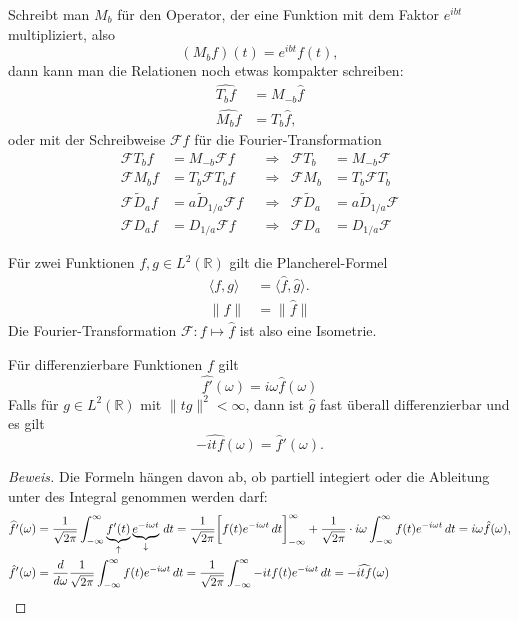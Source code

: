 Schreibt man $M_b$ für den Operator, der eine Funktion mit dem
Faktor $e^{ibt}$ multipliziert, also
\[
(M_bf)(t) = e^{ibt}f(t),
\]
dann kann man die Relationen noch etwas kompakter schreiben:
\begin{align*}
\widehat{T_bf}
&=
M_{-b}\hat{f}
\\
\widehat{M_bf}
&=
T_b\hat{f},
\end{align*}
oder mit der Schreibweise $\mathcal{F}f$ für die Fourier-Transformation
\[
\begin{aligned}
\mathcal{F}T_b f &= M_{-b}\mathcal F f
&&\Rightarrow &
\mathcal{F}T_b &= M_{-b}\mathcal{F}
\\
\mathcal{F}M_b f&=T_b\mathcal{F}T_bf
&&\Rightarrow &
\mathcal{F}M_b&=T_b\mathcal{F}T_b
\\
\mathcal{F}\tilde{D}_af&=a \tilde{D}_{1/a} \mathcal F f
&&\Rightarrow &
\mathcal{F}\tilde{D}_a&=a \tilde{D}_{1/a} \mathcal F 
\\
\mathcal{F}D_af&=D_{1/a} \mathcal F f
&&\Rightarrow &
\mathcal{F}D_a&= D_{1/a} \mathcal F 
\end{aligned}
\]

\begin{satz}
Für zwei Funktionen $f,g\in L^2(\mathbb R)$ gilt die Plancherel-Formel
\begin{align*}
\langle f,g\rangle
&=
\langle \hat{f},\hat{g}\rangle.
\\
\|f\|&=\|\hat{f}\|
\end{align*}
Die Fourier-Transformation $\mathcal{F}\colon f\mapsto \hat{f}$ ist
also eine Isometrie.
\end{satz}

\begin{satz}
Für differenzierbare Funktionen $f$ gilt
\[
\widehat{f'}(\omega) = i\omega \hat{f}(\omega)
\]
Falls für $g\in L^2(\mathbb R)$ mit $\|tg\|^2<\infty$, dann ist $\hat{g}$
fast überall differenzierbar und es gilt
\[
-\widehat{i t f}(\omega) = \hat{f}'(\omega).
\]
\end{satz}

\begin{proof}[Beweis]
Die Formeln hängen davon ab, ob partiell integiert oder die Ableitung
unter des Integral genommen werden darf:
\begin{align*}
\widehat{f'}(\omega)
&=
\frac{1}{\sqrt{2\pi}}
\int_{-\infty}^\infty \underbrace{f'(t)}_{\uparrow}\underbrace{e^{-i\omega t}}_{\downarrow}\,dt
=
\frac{1}{\sqrt{2\pi}}
\biggl[
f(t)e^{-i\omega t}\,dt
\biggr]_{-\infty}^\infty
+
\frac{1}{\sqrt{2\pi}}
\cdot
i\omega
\int_{-\infty}^\infty f(t)e^{-i\omega t}\,dt
=
i\omega\hat{f}(\omega),
\\
\hat{f}'(\omega)
&=
\frac{d}{d\omega}
\frac{1}{\sqrt{2\pi}} \int_{-\infty}^\infty
f(t) e^{-i\omega t}\,dt
=
\frac{1}{\sqrt{2\pi}} \int_{-\infty}^\infty
-it f(t) e^{-i\omega t}\,dt
=
-\widehat{itf}(\omega)
\qedhere
\end{align*}
\end{proof}


